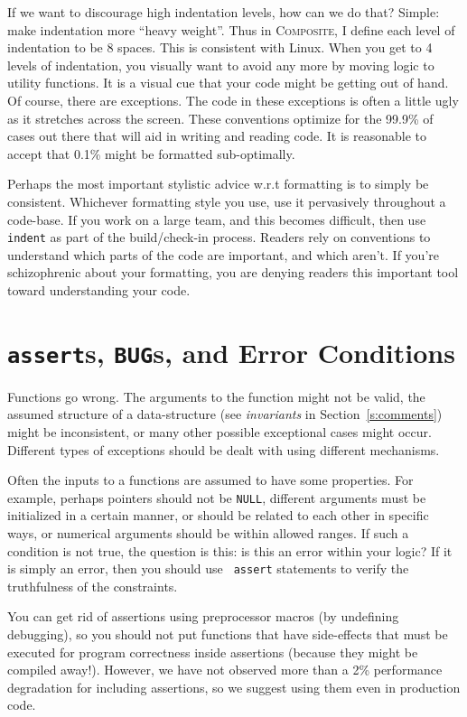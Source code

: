 \documentclass[11pt,onecolumn]{article}
\def\composite{\textsc{Composite}}
\newcommand{\head}[1]{\vspace{0.4em}\noindent{\bf #1}}
\begin{document}
If we want to discourage high indentation levels, how can we do that?
Simple: make indentation more ``heavy weight''.  Thus in \composite ,
I define each level of indentation to be 8 spaces.  This is consistent
with Linux.  When you get to 4 levels of indentation, you visually
want to avoid any more by moving logic to utility functions.  It is a
visual cue that your code might be getting out of hand.  Of course,
there are exceptions.  The code in these exceptions is often a little
ugly as it stretches across the screen.  These conventions optimize
for the 99.9\% of cases out there that will aid in writing and reading
code.  It is reasonable to accept that 0.1\% might be formatted
sub-optimally.

\head{Consistency.}  Perhaps the most important stylistic advice w.r.t
formatting is to simply be consistent.  Whichever formatting style you
use, use it pervasively throughout a code-base.  If you work on a
large team, and this becomes difficult, then use {\tt indent} as part
of the build/check-in process.  Readers rely on conventions to
understand which parts of the code are important, and which aren't.
If you're schizophrenic about your formatting, you are denying readers
this important tool toward understanding your code.

\section{{\tt assert}s, {\tt BUG}s, and Error Conditions}
\label{s:exceptions}

Functions go wrong.  The arguments to the function might not be valid,
the assumed structure of a data-structure (see {\em invariants} in
Section~\ref{s:comments}) might be inconsistent, or many other
possible exceptional cases might occur.  Different types of exceptions
should be dealt with using different mechanisms.

\head{{\tt assert}ion usage.}  Often the inputs to a functions are
assumed to have some properties.  For example, perhaps pointers should
not be {\tt NULL}, different arguments must be initialized in a
certain manner, or should be related to each other in specific ways,
or numerical arguments should be within allowed ranges.  If such a
condition is not true, the question is this: is this an error within
your logic?  If it is simply an error, then you should use {\tt
  assert} statements to verify the truthfulness of the constraints.

You can get rid of assertions using preprocessor macros (by undefining
debugging), so you should not put functions that have side-effects
that must be executed for program correctness inside assertions
(because they might be compiled away!).  However, we have not observed
more than a 2\% performance degradation for including assertions, so
we suggest using them even in production code.
\end{document}

